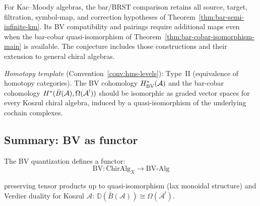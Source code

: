 \begin{remark}[Scope]
For Kac--Moody algebras, the bar/BRST comparison retains all source, target, filtration, symbol-map, and correction hypotheses of Theorem~\ref{thm:bar-semi-infinite-km}.
Its BV compatibility and pairings require additional maps even when the bar-cobar quasi-isomorphism of Theorem~\ref{thm:bar-cobar-isomorphism-main} is available.
The conjecture includes those constructions and their extension to general chiral algebras.

\emph{Homotopy template} (Convention~\ref{conv:hms-levels}): Type~II (equivalence of homotopy categories).
The BV cohomology $H^*_{\mathrm{BV}}(\mathcal{A})$ and the bar-cobar cohomology $H^*(\bar{B}(\mathcal{A}), \Omega(\mathcal{A}^!))$ should be isomorphic as graded vector spaces for every Koszul chiral algebra, induced by a quasi-isomorphism of the underlying cochain complexes.
\end{remark}

\subsection{Summary: BV as functor}

\begin{theorem}
\label{thm:bv-functor}
The BV quantization defines a functor:
\[\mathrm{BV}: \mathrm{ChirAlg}_X \longrightarrow \mathrm{BV\text{-}Alg}\]

preserving tensor products up to quasi-isomorphism (lax monoidal structure) and Verdier duality for Koszul $\mathcal{A}$: $\mathbb{D}(\bar{B}(\mathcal{A})) \cong \Omega(\mathcal{A}^!)$.
\end{theorem}


